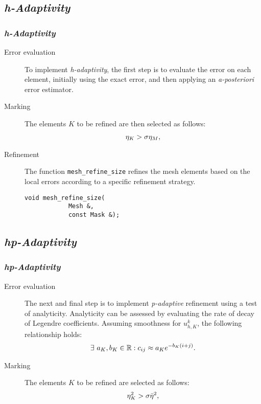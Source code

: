 \subsection{\textit{h-Adaptivity}}

\begin{frame}[fragile]
    \frametitle{\textit{h-Adaptivity}}

    \begin{description}
        \item[Error evaluation] To implement \textit{h-adaptivity}, the first step is to evaluate the error on each element, initially using the exact error, and then applying an \textit{a-posteriori} error estimator.
        \item[Marking] The elements $K$ to be refined are then selected as follows:
            \begin{gather}
                \eta_K > \sigma \eta_{M}, \notag
            \end{gather}
        \item[Refinement] The function \lstinline{mesh_refine_size} refines the mesh elements based on the local errors according to a specific refinement strategy.
        \begin{lstlisting}[style=cpp]
        void mesh_refine_size(
            Mesh &, 
            const Mask &);
        \end{lstlisting}
    \end{description}

\end{frame}

\subsection{\textit{hp-Adaptivity}}

\begin{frame}[fragile]
    \frametitle{\textit{hp-Adaptivity}}

    \begin{description}
        \item[Error evaluation] The next and final step is to implement \textit{p-adaptive} refinement using a test of analyticity. Analyticity can be assessed by evaluating the rate of decay of Legendre coefficients. Assuming smoothness for $u^k_{h, K}$, the following relationship holds:
        \begin{gather}
            \exists ~ a_K, b_K \in \mathbb{R} : c_{ij} \approx a_K e^{-b_K (i + j)}. \notag
        \end{gather}
        \item[Marking] The elements $K$ to be refined are selected as follows:
        \begin{gather}
            \eta_K^2 > \sigma \bar{\eta}^2, \notag
        \end{gather}
    \end{description}

\end{frame}

